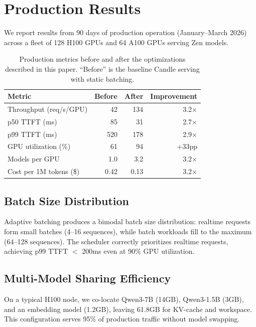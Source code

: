 \section{Production Results}

\label{sec:results}

We report results from 90 days of production operation (January--March 2026)
across a fleet of 128 H100 GPUs and 64 A100 GPUs serving Zen models.

\begin{table}[H]
\centering
\small
\begin{tabular}{lrrr}
\toprule
\textbf{Metric} & \textbf{Before} & \textbf{After} & \textbf{Improvement} \\
\midrule
Throughput (req/s/GPU) & 42 & 134 & 3.2$\times$ \\
p50 TTFT (ms) & 85 & 31 & 2.7$\times$ \\
p99 TTFT (ms) & 520 & 178 & 2.9$\times$ \\
GPU utilization (\%) & 61 & 94 & +33pp \\
Models per GPU & 1.0 & 3.2 & 3.2$\times$ \\
Cost per 1M tokens (\$) & 0.42 & 0.13 & 3.2$\times$ \\
\bottomrule
\end{tabular}
\caption{Production metrics before and after the optimizations described in this
paper. ``Before'' is the baseline Candle serving with static batching.}
\label{tab:results}
\end{table}

\subsection{Batch Size Distribution}

Adaptive batching produces a bimodal batch size distribution: realtime requests
form small batches (4--16 sequences), while batch workloads fill to the maximum
(64--128 sequences). The scheduler correctly prioritizes realtime requests,
achieving p99 TTFT $<$ 200ms even at 90\% GPU utilization.

\subsection{Multi-Model Sharing Efficiency}

On a typical H100 node, we co-locate Qwen3-7B (14GB), Qwen3-1.5B (3GB), and
an embedding model (1.2GB), leaving 61.8GB for KV-cache and workspace. This
configuration serves 95\% of production traffic without model swapping.

